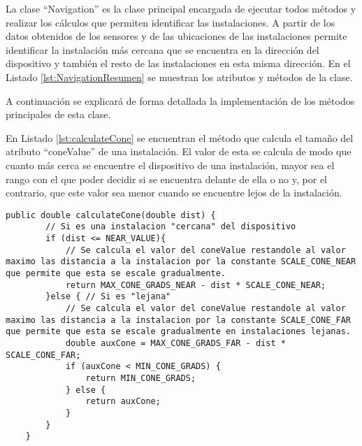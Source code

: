 La clase ``Navigation'' es la clase principal encargada de  ejecutar todos métodos y realizar  los cálculos que permiten identificar las instalaciones. A partir de los datos obtenidos de los sensores y de las ubicaciones de las instalaciones permite identificar la instalación más cercana que se encuentra en la dirección del dispositivo y también el resto de las instalaciones en esta misma dirección. En el Listado \ref{lst:NavigationResumen} se muestran los atributos y métodos de la clase.

\bigskip



A continuación se explicará de forma detallada la implementación de los métodos principales de esta clase.

En Listado \ref{lst:calculateCone} se encuentran el método que calcula el tamaño del atributo ``coneValue'' de una instalación. El valor de esta se calcula de modo que cuanto más cerca se encuentre el dispositivo de una instalación, mayor sea el rango con el que poder decidir si se encuentra delante de ella o no y, por el contrario, que este valor sea menor cuando se encuentre lejos de la instalación.
\bigskip

\bigskip

\bigskip
\begin{lstlisting}[caption={Código para calcular el \textit{coneValue} de identificación de cada instalación.}, label={lst:calculateCone}]
    public double calculateCone(double dist) {
        // Si es una instalacion "cercana" del dispositivo
        if (dist <= NEAR_VALUE){
            // Se calcula el valor del coneValue restandole al valor maximo las distancia a la instalacion por la constante SCALE_CONE_NEAR que permite que esta se escale gradualmente.
            return MAX_CONE_GRADS_NEAR - dist * SCALE_CONE_NEAR;
        }else { // Si es "lejana"
            // Se calcula el valor del coneValue restandole al valor maximo las distancia a la instalacion por la constante SCALE_CONE_FAR que permite que esta se escale gradualmente en instalaciones lejanas.
            double auxCone = MAX_CONE_GRADS_FAR - dist * SCALE_CONE_FAR;
            if (auxCone < MIN_CONE_GRADS) {
                return MIN_CONE_GRADS;
            } else {
                return auxCone;
            }
        }
    }
\end{lstlisting}


